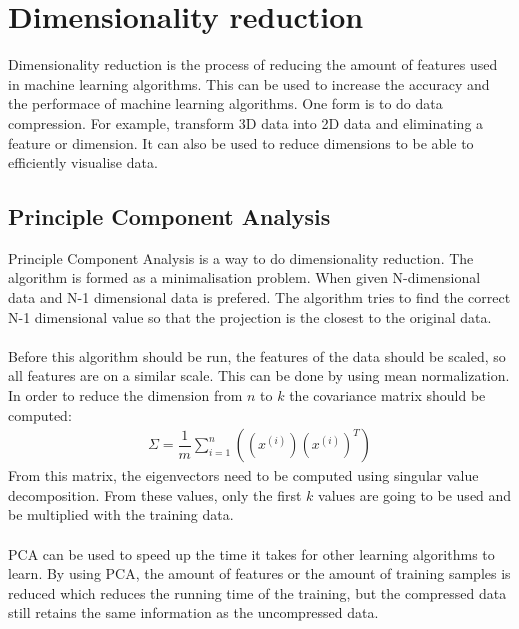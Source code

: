 \section{Dimensionality reduction}
Dimensionality reduction is the process of reducing the amount of features used in machine learning algorithms. This can be used to increase the accuracy and the performace of machine learning algorithms. One form is to do data compression. For example, transform 3D data into 2D data and eliminating a feature or dimension. It can also be used to reduce dimensions to be able to efficiently visualise data.

\subsection{Principle Component Analysis}
Principle Component Analysis is a way to do dimensionality reduction. The algorithm is formed as a minimalisation problem. When given N-dimensional data and N-1 dimensional data is prefered. The algorithm tries to find the correct N-1 dimensional value so that the projection is the closest to the original data. \\\\
Before this algorithm should be run, the features of the data should be scaled, so all features are on a similar scale. This can be done by using mean normalization. In order to reduce the dimension from $n$ to $k$ the covariance matrix should be computed:
\begin{align}
\Sigma = \dfrac{1}{m}\sum\limits_{i=1}^n((x^{(i)}) (x^{(i)})^T)
\end{align}
From this matrix, the eigenvectors need to be computed using singular value decomposition. From these values, only the first $k$ values are going to be used and be multiplied with the training data.\\\\
PCA can be used to speed up the time it takes for other learning algorithms to learn. By using PCA, the amount of features or the amount of training samples is reduced which reduces the running time of the training, but the compressed data still retains the same information as the uncompressed data.

